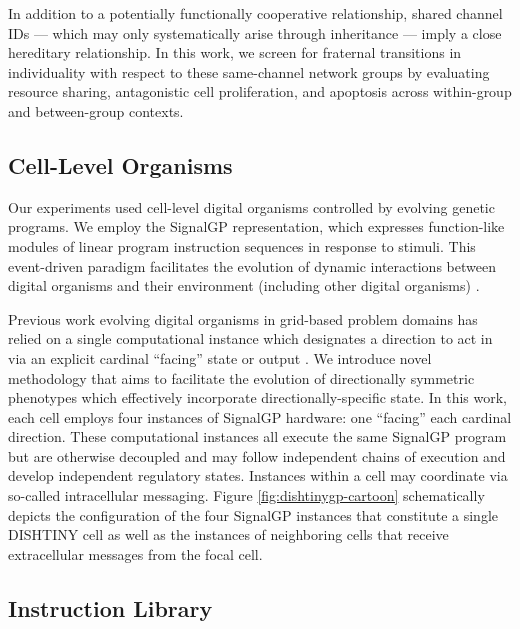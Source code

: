 In addition to a potentially functionally cooperative relationship, shared channel IDs --- which may only systematically arise through inheritance --- imply a close hereditary relationship.
In this work, we screen for fraternal transitions in individuality with respect to these same-channel network groups by evaluating resource sharing, antagonistic cell proliferation, and apoptosis across within-group and between-group contexts.

\subsection{Cell-Level Organisms}



Our experiments used cell-level digital organisms controlled by evolving
genetic programs.
We employ the SignalGP representation, which expresses function-like modules of linear program instruction sequences in response to stimuli.
This event-driven paradigm facilitates the evolution of dynamic interactions between digital organisms and their environment (including other digital organisms) \cite{lalejini2018evolving}.

Previous work evolving digital organisms in grid-based problem domains has relied on a single computational instance which designates a direction to act in via an explicit cardinal ``facing'' state or output \cite{goldsby2014evolutionary, goldsby2018serendipitous, grabowski2010early, biswas2014causes, lalejini2018evolving}.
We introduce novel methodology that aims to facilitate the evolution of directionally symmetric phenotypes which effectively incorporate directionally-specific state.
In this work, each cell employs four instances of SignalGP hardware: one ``facing'' each cardinal direction.
These computational instances all execute the same SignalGP program but are otherwise decoupled and may follow independent chains of execution and develop independent regulatory states.
Instances within a cell may coordinate via so-called intracellular messaging.
Figure \ref{fig:dishtinygp-cartoon} schematically depicts the configuration of the four SignalGP instances that constitute a single DISHTINY cell as well as the instances of neighboring cells that receive extracellular messages from the focal cell.

\subsection{Instruction Library}

